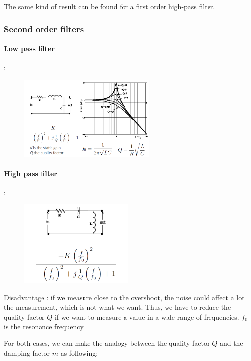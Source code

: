 The same kind of result can be found for a first order high-pass filter. 

\subsubsection{Second order filters}

\paragraph{Low pass filter}:

\begin{figure}[H]
    \centering
    \includegraphics[width = 0.6\textwidth]{L4/img/2nd-LP.PNG}
\end{figure}


\paragraph{High pass filter}:

\begin{figure}[H]
    \centering
    \includegraphics[width = 0.5\textwidth]{L4/img/2nd-HP.PNG}
\end{figure}

Disadvantage : if we measure close to the overshoot, the noise could affect a lot the measurement, which is not what we want. Thus, we have to reduce the quality factor $Q$ if we want to measure a value in a wide range of frequencies. $f_0$ is the resonance frequency.

For both cases, we can make the analogy between the quality factor $Q$ and the damping factor $m$ as following:

